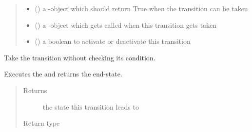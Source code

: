 \documentclass[a4paper,12pt,twoside]{article}
\begin{document}
\begin{fulllineitems}
\begin{quote}
\begin{description}
\begin{itemize}
\item {} 
 (\sphinxstyleliteralemphasis{\sphinxupquote{{[}}}\sphinxstyleliteralemphasis{\sphinxupquote{{[}}}\sphinxstyleliteralemphasis{\sphinxupquote{{]}}}\sphinxstyleliteralemphasis{\sphinxupquote{, }}\sphinxstyleliteralemphasis{\sphinxupquote{{]}}}) \textendash{} a -object which should return True when the transition can be
taken

\item {} 
 (\sphinxstyleliteralemphasis{\sphinxupquote{{[}}}\sphinxstyleliteralemphasis{\sphinxupquote{{[}}}\sphinxstyleliteralemphasis{\sphinxupquote{{]}}}\sphinxstyleliteralemphasis{\sphinxupquote{, }}\sphinxstyleliteralemphasis{\sphinxupquote{{]}}}) \textendash{} a -object which gets called when this transition gets taken

\item {} 
 () \textendash{} a boolean to activate or deactivate this transition

\end{itemize}

\end{description}\end{quote}

\begin{fulllineitems}
\label{\detokenize{osbk_operation:osbk_operation.utility.Transition.force_take}}
Take the transition without checking its condition.

Executes the  and returns the end-state.
\begin{quote}\begin{description}
\item[{Returns}] \leavevmode
the state this transition leads to

\item[{Return type}] \leavevmode
{\hyperref[\detokenize{osbk_operation:osbk_operation.utility.State}]{}}


\end{description}
\end{quote}
\end{fulllineitems}
\end{fulllineitems}
\end{document}

